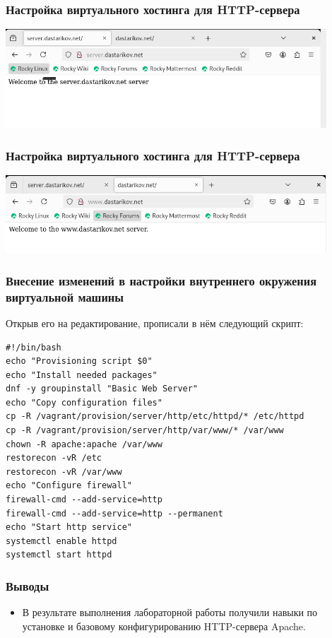 \begin{frame}
\frametitle{Настройка виртуального хостинга для HTTP-сервера}
    \includegraphics[width=0.9\textwidth]{../images/image11.png}
\end{frame}

\begin{frame}
\frametitle{Настройка виртуального хостинга для HTTP-сервера}
    \includegraphics[width=0.9\textwidth]{../images/image12.png}
\end{frame}


\begin{frame}[containsverbatim]
\frametitle{Внесение изменений в настройки внутреннего окружения виртуальной машины}
Открыв его на редактирование, прописали в нём следующий скрипт:
\begin{verbatim}
#!/bin/bash
echo "Provisioning script $0"
echo "Install needed packages"
dnf -y groupinstall "Basic Web Server"
echo "Copy configuration files"
cp -R /vagrant/provision/server/http/etc/httpd/* /etc/httpd
cp -R /vagrant/provision/server/http/var/www/* /var/www
chown -R apache:apache /var/www
restorecon -vR /etc
restorecon -vR /var/www
echo "Configure firewall"
firewall-cmd --add-service=http
firewall-cmd --add-service=http --permanent
echo "Start http service"
systemctl enable httpd
systemctl start httpd
\end{verbatim}
\end{frame}


\begin{frame}
\frametitle{Выводы}
\begin{itemize}
    \item В результате выполнения лабораторной работы получили навыки по установке и базовому конфигурированию HTTP-сервера Apache.
\end{itemize}
\end{frame}


